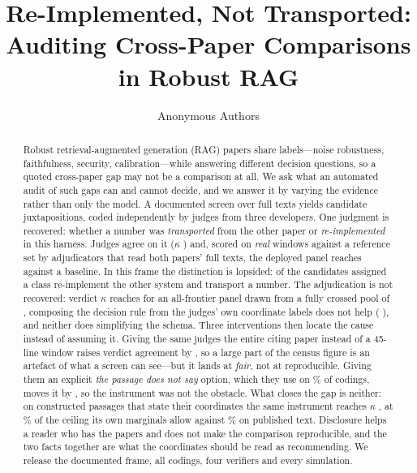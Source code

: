 \documentclass[11pt]{article}
\title{Re-Implemented, Not Transported:\\
Auditing Cross-Paper Comparisons in Robust RAG}
\author{Anonymous Authors}
\date{}
\begin{document}
\maketitle

\begin{abstract}
Robust retrieval-augmented generation (RAG) papers share labels---noise
robustness, faithfulness, security, calibration---while answering different
decision questions, so a quoted cross-paper gap may not be a comparison at all.
We ask what an automated audit of such gaps can and cannot decide, and we
answer it by varying the evidence rather than only the model. A documented
screen over \FlowTexts{} full texts yields \FrameCandidates{} candidate
juxtapositions, coded independently by judges from three developers. One
judgment is recovered: whether a number was \emph{transported} from the other
paper or \emph{re-implemented} in this harness. Judges agree on it ($\kappa$
\DecProvK{}) and, scored on \PrivN{} \emph{real} windows against a reference set
by adjudicators that read both papers' full texts, the deployed panel reaches
\DepPvAcc{} \DepPvCI{} against a \DepPvBase{} baseline. In this frame the
distinction is lopsided: \ProvReimplemented{} of the \ProvClassified{}
candidates assigned a class re-implement the other system and
\ProvTransported{} transport a number. The adjudication is not recovered:
verdict $\kappa$ reaches \TierFrontierVerdictK{} for an all-frontier panel drawn
from a fully crossed pool of \TierPanelN{}, composing the decision rule from the
judges' own coordinate labels does not help (\RuleKDiff{} \RuleKDiffCI{}), and
neither does simplifying the schema. Three interventions then locate the cause
instead of assuming it. Giving the same judges the entire citing paper instead
of a \mbox{45-line} window raises verdict agreement by \LadVdDeltaCite{}
\LadVdDeltaCiteCI{}, so a large part of the census figure is an artefact of what
a screen can see---but it lands at \emph{fair}, not at reproducible. Giving them
an explicit \emph{the passage does not say} option, which they use on
\AbsShare\% of codings, moves it by \AbsKDiff{} \AbsKDiffCI{}, so the instrument
was not the obstacle. What closes the gap is neither: on constructed passages
that state their coordinates the same instrument reaches $\kappa$ \InsFullK{},
at \KShareIns\% of the ceiling its own marginals allow against \KShareCensus\%
on published text. Disclosure helps a reader who has the papers and does not
make the comparison reproducible, and the two facts together are what the
coordinates should be read as recommending. We release the documented frame, all
codings, four verifiers and every simulation.
\end{abstract}
\end{document}
